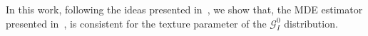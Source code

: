 \documentclass[technote,onecolumn,draftcls,12pt]{IEEEtran}
\newtheorem{definition}{Definition}
\numberwithin{equation}{section}
\newtheorem{theorem}{Theorem}[section]
\begin{document}
In this work, following the ideas presented in~\cite{parr1982},  we show that, the MDE estimator presented in~\cite{gambini2015}, is consistent for the texture parameter of the $\mathcal{G}_I^{0}$ distribution. 
%
%
\end{document}
